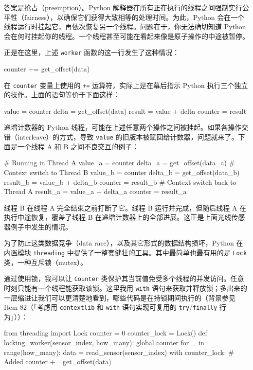 答案是抢占（preemption）。Python 解释器在所有正在执行的线程之间强制实行公平性（fairness），以确保它们获得大致相等的处理时间。为此，Python 会在一个线程运行时挂起它，再依次恢复另一个线程。问题在于，你无法确切知道 Python 会在何时挂起你的线程。一个线程甚至可能在看起来像是原子操作的中途被暂停。

正是在这里，上述 \texttt{worker} 函数的这一行发生了这种情况：

\begin{codebox}[python]
counter += get_offset(data)
\end{codebox}

在 \texttt{counter} 变量上使用的 \texttt{+=} 运算符，实际上是在幕后指示 Python 执行三个独立的操作。上面的语句等价于下面这样：

\begin{codebox}[python]
value = counter
delta = get_offset(data)
result = value + delta
counter = result
\end{codebox}

递增计数器的 Python 线程，可能在上述任意两个操作之间被挂起。如果各操作交错（interleave）的方式，导致 \texttt{value} 的旧版本被赋回给计数器，问题就来了。下面是一个线程 A 和 B 之间不良交互的例子：

\begin{codebox}[python]
# Running in Thread A
value_a = counter
delta_a = get_offset(data_a)
# Context switch to Thread B
value_b = counter
delta_b = get_offset(data_b)
result_b = value_b + delta_b
counter = result_b
# Context switch back to Thread A
result_a = value_a + delta_a
counter = result_a
\end{codebox}

线程 B 在线程 A 完全结束之前打断了它。线程 B 运行并完成，但随后线程 A 在执行中途恢复，覆盖了线程 B 在递增计数器上的全部进展。这正是上面光线传感器例子中发生的情况。

为了防止这类数据竞争（data race），以及其它形式的数据结构损坏，Python 在内置模块 \texttt{threading} 中提供了一整套健壮的工具。其中最简单也最有用的是 \texttt{Lock} 类，一种互斥锁（mutex）。

通过使用锁，我可以让 \texttt{Counter} 类保护其当前值免受多个线程的并发访问。任意时刻只能有一个线程能获取该锁。这里我用 \texttt{with} 语句来获取并释放锁；多出来的一层缩进让我们可以更清楚地看到，哪些代码是在持锁期间执行的（背景参见 Item 82（「考虑用 \texttt{contextlib} 和 \texttt{with} 语句实现可复用的 \texttt{try}/\texttt{finally} 行为」））：

\begin{codebox}[python]
from threading import Lock
counter = 0
counter_lock = Lock()
def locking_worker(sensor_index, how_many):
    global counter
    for _ in range(how_many):
        data = read_sensor(sensor_index)
        with counter_lock:                  # Added
            counter += get_offset(data)
\end{codebox}

